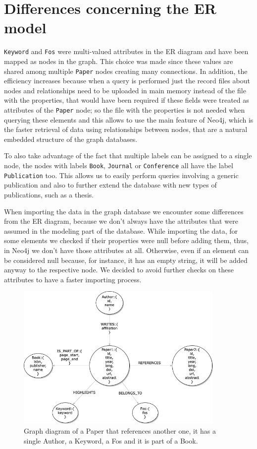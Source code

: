 \section{Differences concerning the ER model}
\label{sec:differences_concerning_the_er_model}%
\verb|Keyword| and \verb|Fos| were multi-valued attributes in the ER diagram and have been mapped as nodes in the graph.
This choice was made since these values are shared among multiple \verb|Paper| nodes creating many connections.
In addition, the efficiency increases because when a query is performed just the record files about nodes and relationships need to be uploaded in main memory instead of the file with the properties, that would have been required if these fields were treated as attributes of the \verb|Paper| node;
so the file with the properties is not needed when querying these elements and this allows to use the main feature of Neo4j, which is the faster retrieval of data using relationships between nodes, that are a natural embedded structure of the graph databases.

To also take advantage of the fact that multiple labels can be assigned to a single node, the nodes with labels \verb|Book|, \verb|Journal| or \verb|Conference| all have the label \verb|Publication| too.
This allows us to easily perform queries involving a generic publication and also to further extend the database with new types of publications, such as a thesis.

When importing the data in the graph database we encounter some differences from the ER diagram, because we don't always have the attributes that were assumed in the modeling part of the database.
While importing the data, for some elements we checked if their properties were null before adding them, thus, in Neo4j we don't have those attributes at all.
Otherwise, even if an element can be considered null because, for instance, it has an empty string, it will be added anyway to the respective node.
We decided to avoid further checks on these attributes to have a faster importing process.
\begin{figure}[H]
    \begin{center}
        \includegraphics[width=0.9\textwidth]{Images/graph_diagram}
        \caption{Graph diagram of a Paper that references another one, it has a single Author, a Keyword, a Fos and it is part of a Book.}
        \label{fig:graph_diagram}%
    \end{center}
\end{figure}


